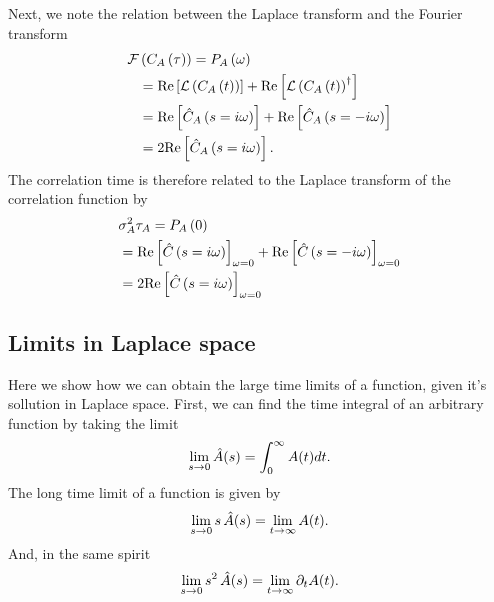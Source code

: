 Next, we note the relation between the Laplace transform and the Fourier transform
\begin{align}
\elabel{si:FT_of_corr}
{\cal F}&\br{C_A\br{\tau}}=P_A\br{\omega}\\
&={\rm Re}\sqbr{{\cal L}\br{C_A\br{t}}}+{\rm Re}\sqbr{{\cal L}\br{C_A\br{t}}^{\dagger}}\\
&={\rm Re}\sqbr{\hat{C}_A\br{s=i\omega}}+{\rm Re}\sqbr{\hat{C}_A\br{s=-i\omega}}\\
&=2{\rm Re}\sqbr{\hat{C}_A\br{s=i\omega}}.
\end{align}
The correlation time is therefore related to the Laplace transform of the correlation function by
\begin{align}
\elabel{si:laplace_corr_func_corr_time}
&\sigma_A^2\tau_A=P_A\br{0}\\
&={\rm Re}\sqbr{\hat{C}\br{s=i\omega}}_{\omega=0}+{\rm Re}\sqbr{\hat{C}\br{s=-i\omega}}_{\omega=0}\\
&=2{\rm Re}\sqbr{\hat{C}\br{s=i\omega}}_{\omega=0}
\end{align}


\subsection{ Limits in Laplace space}
Here we show how we can obtain the large time limits of a function, given it's sollution in Laplace space. First, we can find the time integral of an arbitrary function by taking the limit
\begin{align}
\lim_{s \to 0} \hat{A}(s) = \int_0^\infty A(t) dt.
\elabel{si:int_vs_lap}
\end{align}
The long time limit of a function is given by
\begin{align}
\lim_{s \to 0} s \, \hat{A}(s) = \lim_{t \to \infty} A(t).
\elabel{si:longt_in_lap}
\end{align}
And, in the same spirit
\begin{align}
\lim_{s \to 0} s^2 \, \hat{A}(s) = \lim_{t \to \infty} \partial_t A(t).
\elabel{si:longt_in_lap2}
\end{align}


